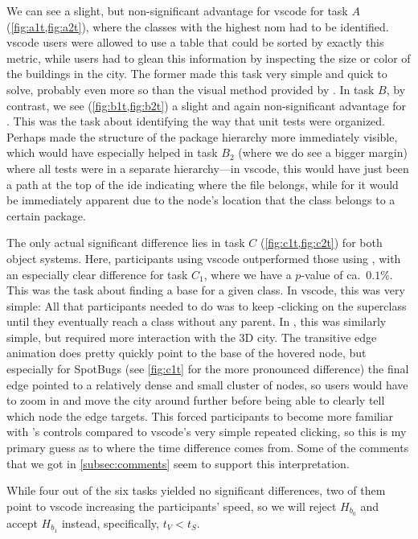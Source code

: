 \documentclass[../thesis]{subfiles}
\begin{document}
We can see a slight, but non-significant advantage for \gls{vscode} for task $A$ (\cref{fig:a1t,fig:a2t}), where the classes with the highest \gls{nom} had to be identified.
\gls{vscode} users were allowed to use a table that could be sorted by exactly this metric, while \SEE{} users had to glean this information by inspecting the size or color of the buildings in the \gls{city}.
The former made this task very simple and quick to solve, probably even more so than the visual method provided by \SEE{}.
In task $B$, by contrast, we see (\cref{fig:b1t,fig:b2t}) a slight and again non-significant advantage for \SEE{}.
This was the task about identifying the way that unit tests were organized.
Perhaps \SEE{} made the structure of the package hierarchy more immediately visible, which would have especially helped in task $B_2$ (where we do see a bigger margin) where all tests were in a separate hierarchy---in \gls{vscode}, this would have just been a path at the top of the \gls{ide} indicating where the file belongs, while for \SEE{} it would be immediately apparent due to the node's location that the class belongs to a certain package.

The only actual significant difference lies in task $C$ (\cref{fig:c1t,fig:c2t}) for both object systems.
Here, participants using \gls{vscode} outperformed those using \SEE{}, with an especially clear difference for task $C_1$, where we have a $p$-value of ca.\ $0.1\%$.
This was the task about finding a \gls{base} for a given class.
In \gls{vscode}, this was very simple:
All that participants needed to do was to keep -clicking on the superclass until they eventually reach a class without any parent.
In \SEE{}, this was similarly simple, but required more interaction with the 3D city.
The transitive edge animation does pretty quickly point to the \gls{base} of the hovered node, but especially for SpotBugs (see \cref{fig:c1t} for the more pronounced difference) the final edge pointed to a relatively dense and small cluster of nodes, so users would have to zoom in and move the city around further before being able to clearly tell which node the edge targets.
This forced participants to become more familiar with \SEE{}'s controls compared to \gls{vscode}'s very simple repeated clicking, so this is my primary guess as to where the time difference comes from.
Some of the comments that we got in \cref{subsec:comments} seem to support this interpretation.

While four out of the six tasks yielded no significant differences, two of them point to \gls{vscode} increasing the participants' speed, so we will reject $H_{b_0}$ and accept $H_{b_1}$ instead, specifically, $t_V < t_S$.
\end{document}
